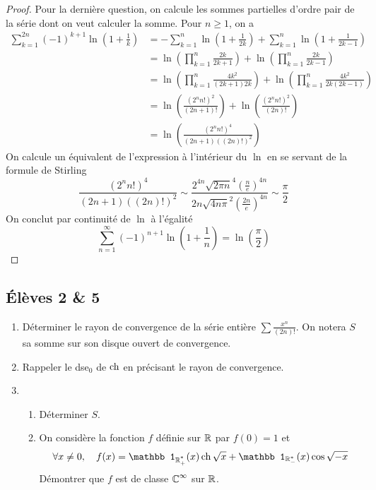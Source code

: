 \documentclass[10pt]{scrartcl}
\begin{document}
    \begin{proof}
        Pour la dernière question, on calcule les sommes partielles d'ordre pair de la série dont on veut calculer la somme. 
        Pour $n\geq 1$, on a 
        \begin{align*}
            \sum_{k=1}^{2n}(-1)^{k+1}\ln\left(1+\frac1k\right)
            &=-\sum_{k=1}^n\ln\left(1+\frac1{2k}\right)
            +\sum_{k=1}^n\ln\left(1+\frac1{2k-1}\right)\\
            &=\ln\left(\prod_{k=1}^n\frac{2k}{2k+1}\right)
            +\ln\left(\prod_{k=1}^n\frac{2k}{2k-1}\right)\\
            &=\ln\left(\prod_{k=1}^n\frac{4k^2}{(2k+1)2k}\right)
            +\ln\left(\prod_{k=1}^n\frac{4k^2}{2k(2k-1)}\right)\\
            &=\ln\left(\frac{(2^nn!)^2}{(2n+1)!}\right)+\ln\left(\frac{(2^nn!)^2}{(2n)!}\right)\\
            &=\ln\left(\frac{(2^nn!)^4}{(2n+1)((2n)!)^2}\right)
        \end{align*}
        On calcule un équivalent de l'expression à l'intérieur du $\ln$ en se servant de la formule de Stirling 
        \[
            \frac{(2^nn!)^4}{(2n+1)((2n)!)^2}\sim 
            \frac{2^{4n}\sqrt{2\pi n}^4\left(\frac ne\right)^{4n}}{2n\sqrt{4n\pi}^2\left(\frac{2n}e\right)^{4n}}\sim 
            \frac\pi2            
        \]
        On conclut par continuité de $\ln$ à l'égalité 
        \[
            \sum_{n=1}^\infty(-1)^{n+1}\ln\left(1+\frac1n\right)=\ln\left(\frac\pi2\right)
        \]
    \end{proof}
    

    \subsection*{Élèves 2 \& 5}   
    \begin{ccp}
        \begin{enumerate}
            \item Déterminer le rayon de convergence de la série entière $\sum\frac{x^n}{(2n)!}$. 
            On notera $S$ sa somme sur son disque ouvert de convergence. 
            \item Rappeler le dse${}_0$ de $\operatorname{ch}$ en précisant le rayon de convergence. 
            \item \begin{enumerate}
                \item Déterminer $S$.
                \item On considère la fonction $f$ définie sur $\operatorname{\mathbb R}$ par $f(0)=1$ et
                \[
                    \forall x\neq 0,\quad f(x)=\mathbb1_{\Rpe}(x)\ch\sqrt x+\mathbb1_{\R_-^*}(x)\cos\sqrt{-x}
                \] 
                Démontrer que $f$ est de classe $\operatorname{\mathbb C}^\infty$ sur $\operatorname{\mathbb R}$.
            \end{enumerate}
        \end{enumerate}
    \end{ccp}
\end{document}
